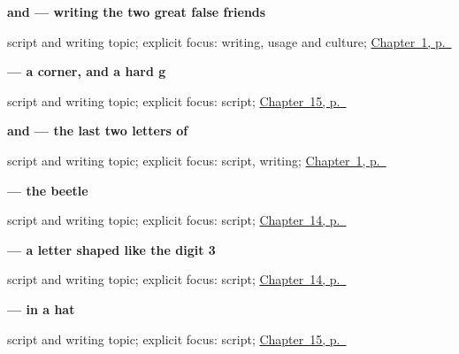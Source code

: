 \noindent\begin{minipage}[t]{\linewidth}
\raggedright
\textbf{ and  — writing the two great false friends}\par
\footnotesize script and writing topic; explicit focus: writing, usage and culture; \hyperref[ch:russian-greetings]{Chapter~1, p.~\pageref*{ch:russian-greetings}}
\end{minipage}\par\smallskip

\noindent\begin{minipage}[t]{\linewidth}
\raggedright
\textbf{ — a corner, and a hard g}\par
\footnotesize script and writing topic; explicit focus: script; \hyperref[ch:ru-script-eight]{Chapter~15, p.~\pageref*{ch:ru-script-eight}}
\end{minipage}\par\smallskip

\noindent\begin{minipage}[t]{\linewidth}
\raggedright
\textbf{ and  — the last two letters of }\par
\footnotesize script and writing topic; explicit focus: script, writing; \hyperref[ch:russian-greetings]{Chapter~1, p.~\pageref*{ch:russian-greetings}}
\end{minipage}\par\smallskip

\noindent\begin{minipage}[t]{\linewidth}
\raggedright
\textbf{ — the beetle}\par
\footnotesize script and writing topic; explicit focus: script; \hyperref[ch:ru-script-eleven]{Chapter~14, p.~\pageref*{ch:ru-script-eleven}}
\end{minipage}\par\smallskip

\noindent\begin{minipage}[t]{\linewidth}
\raggedright
\textbf{ — a letter shaped like the digit 3}\par
\footnotesize script and writing topic; explicit focus: script; \hyperref[ch:ru-script-eleven]{Chapter~14, p.~\pageref*{ch:ru-script-eleven}}
\end{minipage}\par\smallskip

\noindent\begin{minipage}[t]{\linewidth}
\raggedright
\textbf{ —  in a hat}\par
\footnotesize script and writing topic; explicit focus: script; \hyperref[ch:ru-script-eight]{Chapter~15, p.~\pageref*{ch:ru-script-eight}}
\end{minipage}\par\smallskip

